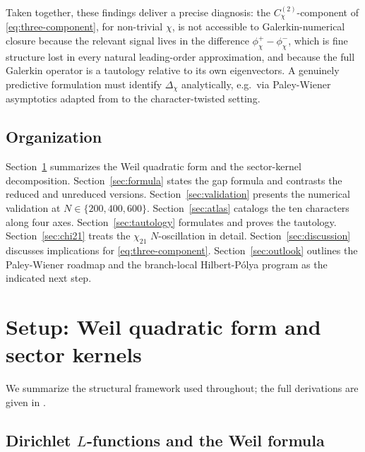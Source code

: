 \documentclass[a4paper,10pt,twocolumn]{article}
\theoremstyle{definition}
\theoremstyle{remark}
\newcommand{\chifn}{\chi}
\newcommand{\Deltachi}{\Delta_{\chifn}}
\begin{document}
Taken together, these findings deliver a precise diagnosis: the
$C^{(2)}_{\chifn}$-component of \eqref{eq:three-component}, for
non-trivial $\chi$, is not accessible to Galerkin-numerical closure
because the relevant signal lives in the difference
$\phi^+_{\chifn}-\phi^-_{\chifn}$, which is fine structure lost in
every natural leading-order approximation, and because the full
Galerkin operator is a tautology relative to its own eigenvectors.
A genuinely predictive formulation must identify
$\Deltachi$ analytically, e.g.\ via Paley-Wiener asymptotics
\cite{PaleyWiener} adapted from \cite{RH_II} to the
character-twisted setting.

\subsection{Organization}

Section~\ref{sec:setup} summarizes the Weil quadratic form and the
sector-kernel decomposition. Section~\ref{sec:formula} states the
gap formula and contrasts the reduced and unreduced versions.
Section~\ref{sec:validation} presents the numerical validation at
$N\in\{200,400,600\}$. Section~\ref{sec:atlas} catalogs the ten
characters along four axes. Section~\ref{sec:tautology} formulates
and proves the tautology. Section~\ref{sec:chi21} treats the
$\chi_{21}$ $N$-oscillation in detail. Section~\ref{sec:discussion}
discusses implications for \eqref{eq:three-component}. Section~\ref{sec:outlook}
outlines the Paley-Wiener roadmap and the branch-local
Hilbert-P\'olya program as the indicated next step.

\section{Setup: Weil quadratic form and sector kernels}
\label{sec:setup}

We summarize the structural framework used throughout; the full
derivations are given in \cite{AnalyticKernel}.

\subsection{\texorpdfstring{Dirichlet $L$-functions}{Dirichlet L-functions} and the Weil formula}
\end{document}
